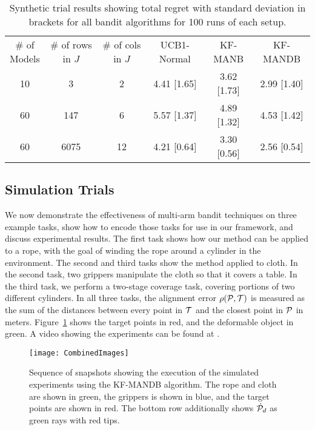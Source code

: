 \begin{table}[h]
\centering
\caption{Synthetic trial results showing total regret with standard deviation in brackets for all bandit algorithms for 100 runs of each setup.}
\label{tab:synthetic_results}
\begin{tabular}{cccccc}
\hline\noalign{\smallskip}
\makecell{\# of\\Models} & \makecell{\# of rows\\in $J$}    & \makecell{\# of cols\\in $J$} & UCB1-Normal & KF-MANB     & KF-MANDB \\
\noalign{\smallskip}\hline\noalign{\smallskip}
10                      & 3                                 & 2                             & 4.41 [1.65] & 3.62 [1.73] & 2.99 [1.40] \\
60                      & 147                               & 6                             & 5.57 [1.37] & 4.89 [1.32] & 4.53 [1.42] \\
60                      & 6075                              & 12                            & 4.21 [0.64] & 3.30 [0.56] & 2.56 [0.54] \\
\hline
\end{tabular}
\end{table}


\subsection{Simulation Trials}

We now demonstrate the effectiveness of multi-arm bandit techniques on three example tasks, show how to encode those tasks for use in our framework, and discuss experimental results. The first task shows how our method can be applied to a rope, with the goal of winding the rope around a cylinder in the environment. The second and third tasks show the method applied to cloth. In the second task, two grippers manipulate the cloth so that it covers a table. In the third task, we perform a two-stage coverage task, covering portions of two different cylinders. In all three tasks, the alignment error $\rho(\mathcal{P}, \mathcal{T})$ is measured as the sum of the distances between every point in $\mathcal{T}$ and the closest point in $\mathcal{P}$ in meters. Figure~\ref{fig:simulation_task_screenshots} shows the target points in red, and the deformable object in green. A video showing the experiments can be found at \taseurl.

\begin{figure}[h]
    \centering
    \texttt{[image: CombinedImages]}
    \caption{Sequence of snapshots showing the execution of the simulated experiments using the KF-MANDB algorithm. The rope and cloth are shown in green, the grippers is shown in blue, and the target points are shown in red. The bottom row additionally shows $\dot{\mathcal{P}}_d$ as green rays with red tips.}
    \label{fig:simulation_task_screenshots}
\end{figure}

